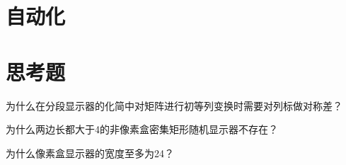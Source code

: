 \section{自动化}

\section{思考题}
\begin{problemset}
\item 为什么在分段显示器的化简中对矩阵进行初等列变换时需要对列标做对称差？
\item 为什么两边长都大于4的非像素盒密集矩形随机显示器不存在？
\item 为什么像素盒显示器的宽度至多为24？
\end{problemset}